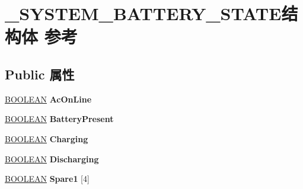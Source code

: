 \hypertarget{struct___s_y_s_t_e_m___b_a_t_t_e_r_y___s_t_a_t_e}{}\section{\+\_\+\+S\+Y\+S\+T\+E\+M\+\_\+\+B\+A\+T\+T\+E\+R\+Y\+\_\+\+S\+T\+A\+T\+E结构体 参考}
\label{struct___s_y_s_t_e_m___b_a_t_t_e_r_y___s_t_a_t_e}
\subsection*{Public 属性}
\begin{DoxyCompactItemize}
\item 
\mbox{\label{struct___s_y_s_t_e_m___b_a_t_t_e_r_y___s_t_a_t_e_ab99b0bc83d0a0825e4b79c39005dcdb3}} 
\hyperlink{_processor_bind_8h_a112e3146cb38b6ee95e64d85842e380a}{B\+O\+O\+L\+E\+AN} {\bfseries Ac\+On\+Line}
\item 
\mbox{\label{struct___s_y_s_t_e_m___b_a_t_t_e_r_y___s_t_a_t_e_a6d800e7a8f3d131d3bff31894048f09b}} 
\hyperlink{_processor_bind_8h_a112e3146cb38b6ee95e64d85842e380a}{B\+O\+O\+L\+E\+AN} {\bfseries Battery\+Present}
\item 
\mbox{\label{struct___s_y_s_t_e_m___b_a_t_t_e_r_y___s_t_a_t_e_a2f7a08c95331462d374b97dfd51adc3e}} 
\hyperlink{_processor_bind_8h_a112e3146cb38b6ee95e64d85842e380a}{B\+O\+O\+L\+E\+AN} {\bfseries Charging}
\item 
\mbox{\label{struct___s_y_s_t_e_m___b_a_t_t_e_r_y___s_t_a_t_e_a8a5e3522fbad428126196e7f0f6bc78e}} 
\hyperlink{_processor_bind_8h_a112e3146cb38b6ee95e64d85842e380a}{B\+O\+O\+L\+E\+AN} {\bfseries Discharging}
\item 
\mbox{\label{struct___s_y_s_t_e_m___b_a_t_t_e_r_y___s_t_a_t_e_a644da69b3f021ed1fd4bc21227a4632a}} 
\hyperlink{_processor_bind_8h_a112e3146cb38b6ee95e64d85842e380a}{B\+O\+O\+L\+E\+AN} {\bfseries Spare1} \mbox{[}4\mbox{]}
\item 
\mbox{\label{struct___s_y_s_t_e_m___b_a_t_t_e_r_y___s_t_a_t_e_a8b951b8c7d5c78036088777cbf39afbb}} 

\end{DoxyCompactItemize}
